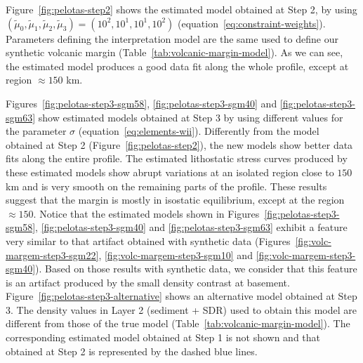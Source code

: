 \documentclass[manuscript]{geophysics}
\begin{document}
Figure~\ref{fig:pelotas-step2} shows the estimated model obtained at Step 2,
by using $(\tilde{\mu}_{0}, \tilde{\mu}_{1}, \tilde{\mu}_{2}, \tilde{\mu}_{3}) 
= (10^{2}, 10^{1}, 10^{1}, 10^{2})$ (equation~\ref{eq:constraint-weights}).
Parameters defining the interpretation model are the same used
to define our synthetic volcanic margin (Table~\ref{tab:volcanic-margin-model}).
As we can see, the estimated model produces a good data fit along the whole
profile, except at region $\approx 150$ km.

Figures~\ref{fig:pelotas-step3-sgm58}, \ref{fig:pelotas-step3-sgm40} and 
\ref{fig:pelotas-step3-sgm63} show estimated models obtained at
Step 3 by using different values for the parameter $\sigma$
(equation~\ref{eq:elements-wii}).
Differently from the model obtained at Step 2 (Figure~\ref{fig:pelotas-step2}), 
the new models show better data fits along the entire profile.
The estimated lithostatic stress curves produced by these estimated models 
show abrupt variations at an isolated region close to $150$ km and is very smooth on the remaining parts
of the profile. These results suggest that the margin is mostly in isostatic 
equilibrium, except at the region $\approx 150$.
Notice that the estimated models shown in Figures~\ref{fig:pelotas-step3-sgm58}, 
\ref{fig:pelotas-step3-sgm40} and \ref{fig:pelotas-step3-sgm63} exhibit a feature
very similar to that artifact obtained with synthetic data 
(Figures~\ref{fig:volc-margem-step3-sgm22}, \ref{fig:volc-margem-step3-sgm10} and 
\ref{fig:volc-margem-step3-sgm40}). Based on those results with synthetic data, 
we consider that this feature is an artifact produced by the small
density contrast at basement.
Figure~\ref{fig:pelotas-step3-alternative} shows an alternative 
model obtained at Step 3.
The density values in Layer 2 (sediment + SDR) used to obtain this model 
are different from those of the true model (Table~\ref{tab:volcanic-margin-model}).
The corresponding estimated model obtained at Step 1 is not shown and
that obtained at Step 2 is represented by the dashed blue lines.
\end{document}
